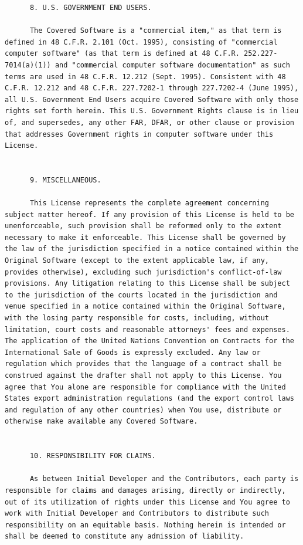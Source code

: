 \documentclass[10pt, headsepline,DIV14,BCOR0.5cm]{scrreprt}
\begin{document}
\begin{lstlisting}
      8. U.S. GOVERNMENT END USERS.

      The Covered Software is a "commercial item," as that term is defined in 48 C.F.R. 2.101 (Oct. 1995), consisting of "commercial computer software" (as that term is defined at 48 C.F.R. 252.227-7014(a)(1)) and "commercial computer software documentation" as such terms are used in 48 C.F.R. 12.212 (Sept. 1995). Consistent with 48 C.F.R. 12.212 and 48 C.F.R. 227.7202-1 through 227.7202-4 (June 1995), all U.S. Government End Users acquire Covered Software with only those rights set forth herein. This U.S. Government Rights clause is in lieu of, and supersedes, any other FAR, DFAR, or other clause or provision that addresses Government rights in computer software under this License.
    

      9. MISCELLANEOUS.

      This License represents the complete agreement concerning subject matter hereof. If any provision of this License is held to be unenforceable, such provision shall be reformed only to the extent necessary to make it enforceable. This License shall be governed by the law of the jurisdiction specified in a notice contained within the Original Software (except to the extent applicable law, if any, provides otherwise), excluding such jurisdiction's conflict-of-law provisions. Any litigation relating to this License shall be subject to the jurisdiction of the courts located in the jurisdiction and venue specified in a notice contained within the Original Software, with the losing party responsible for costs, including, without limitation, court costs and reasonable attorneys' fees and expenses. The application of the United Nations Convention on Contracts for the International Sale of Goods is expressly excluded. Any law or regulation which provides that the language of a contract shall be construed against the drafter shall not apply to this License. You agree that You alone are responsible for compliance with the United States export administration regulations (and the export control laws and regulation of any other countries) when You use, distribute or otherwise make available any Covered Software.
    

      10. RESPONSIBILITY FOR CLAIMS.

      As between Initial Developer and the Contributors, each party is responsible for claims and damages arising, directly or indirectly, out of its utilization of rights under this License and You agree to work with Initial Developer and Contributors to distribute such responsibility on an equitable basis. Nothing herein is intended or shall be deemed to constitute any admission of liability.
\end{lstlisting}
\end{document}
